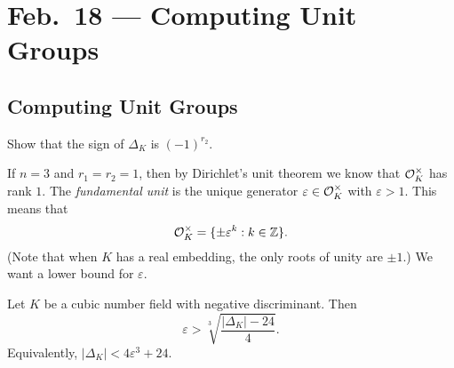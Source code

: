 \chapter{Feb.~18 --- Computing Unit Groups}

\section{Computing Unit Groups}

\begin{exercise}
  Show that the sign of $\Delta_K$ is
  $(-1)^{r_2}$.
\end{exercise}

\begin{remark}
  If $n = 3$ and $r_1 = r_2 = 1$, then
  by Dirichlet's unit theorem we know that
  $\mathcal{O}_K^\times$ has rank
  $1$. The \emph{fundamental unit} is the unique
  generator $\varepsilon \in \mathcal{O}_K^\times$ with
  $\varepsilon > 1$. This means that
  \[
    \mathcal{O}_K^\times = \{\pm \varepsilon^k : k \in \mathbb{Z}\}.
  \]
  (Note that when $K$ has a real embedding, the
  only roots of unity are $\pm 1$.) We want a lower
  bound for $\varepsilon$.
\end{remark}

\begin{lemma}
  Let $K$ be a cubic number field with negative
  discriminant. Then
  \[
    \varepsilon > \sqrt[3]{\frac{|\Delta_K| - 24}{4}}.
  \]
  Equivalently, $|\Delta_K| < 4 \varepsilon^3 + 24$.
\end{lemma}

